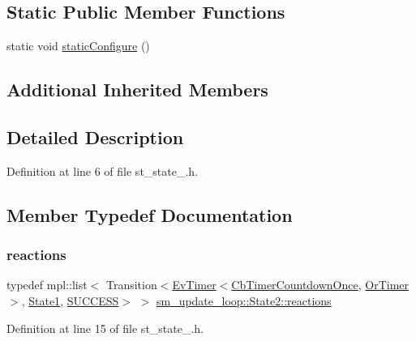 \subsection*{Static Public Member Functions}
\begin{DoxyCompactItemize}
\item 
static void \hyperlink{structsm__update__loop_1_1State2_a1def7d74eb295ef6fdfdd122affa921d}{static\+Configure} ()
\end{DoxyCompactItemize}
\subsection*{Additional Inherited Members}


\subsection{Detailed Description}


Definition at line 6 of file st\+\_\+state\+\_.\+h.



\subsection{Member Typedef Documentation}
\mbox{\label{structsm__update__loop_1_1State2_a568e8e1054b11a61f72133866608b392}} 
\subsubsection{\texorpdfstring{reactions}{reactions}}
{\footnotesize\ttfamily typedef mpl\+::list$<$ Transition$<$\hyperlink{structcl__ros__timer_1_1EvTimer}{Ev\+Timer}$<$\hyperlink{classcl__ros__timer_1_1CbTimerCountdownOnce}{Cb\+Timer\+Countdown\+Once}, \hyperlink{classsm__update__loop_1_1OrTimer}{Or\+Timer}$>$, \hyperlink{structsm__update__loop_1_1State1}{State1}, \hyperlink{structsmacc_1_1default__transition__tags_1_1SUCCESS}{S\+U\+C\+C\+E\+SS}$>$ $>$ \hyperlink{structsm__update__loop_1_1State2_a568e8e1054b11a61f72133866608b392}{sm\+\_\+update\+\_\+loop\+::\+State2\+::reactions}}



Definition at line 15 of file st\+\_\+state\+\_.\+h.



